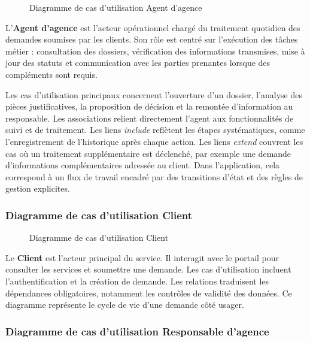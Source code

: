 \begin{figure}[H]
  \centering
  
  \caption{Diagramme de cas d'utilisation Agent d'agence}
  \label{fig:dcu_agent_agence}
\end{figure}

L'\textbf{Agent d'agence} est l'acteur opérationnel chargé du traitement quotidien des demandes soumises par les clients. Son rôle est centré sur l'exécution des tâches métier : consultation des dossiers, vérification des informations transmises, mise à jour des statuts et communication avec les parties prenantes lorsque des compléments sont requis.

Les cas d'utilisation principaux concernent l'ouverture d'un dossier, l'analyse des pièces justificatives, la proposition de décision et la remontée d'information au responsable. Les associations relient directement l'agent aux fonctionnalités de suivi et de traitement. Les liens \emph{include} reflètent les étapes systématiques, comme l'enregistrement de l'historique après chaque action. Les liens \emph{extend} couvrent les cas où un traitement supplémentaire est déclenché, par exemple une demande d'informations complémentaires adressée au client. Dans l'application, cela correspond à un flux de travail encadré par des transitions d'état et des règles de gestion explicites.

\newpage
\subsubsection{Diagramme de cas d'utilisation Client}

\begin{figure}[H]
  \centering
  
  \caption{Diagramme de cas d'utilisation Client}
  \label{fig:dcu_client}
\end{figure}

Le \textbf{Client} est l'acteur principal du service. Il interagit avec le portail pour consulter les services et soumettre une demande. Les cas d'utilisation incluent l'authentification et la création de demande. Les relations traduisent les dépendances obligatoires, notamment les contrôles de validité des données. Ce diagramme représente le cycle de vie d'une demande côté usager.

\newpage
\subsubsection{Diagramme de cas d'utilisation Responsable d'agence}


